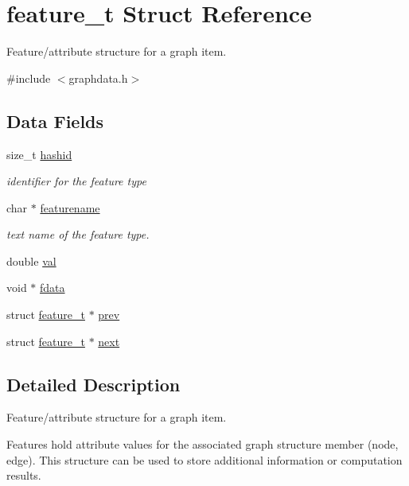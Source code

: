 \hypertarget{structfeature__t}{}\section{feature\+\_\+t Struct Reference}
\label{structfeature__t}


Feature/attribute structure for a graph item.  




{\ttfamily \#include $<$graphdata.\+h$>$}

\subsection*{Data Fields}
\begin{DoxyCompactItemize}
\item 
size\+\_\+t \hyperlink{structfeature__t_a9622cb072e66eb7ad9dd21feeaf8991c}{hashid}
\begin{DoxyCompactList}\small\item\em identifier for the feature type \end{DoxyCompactList}\item 
char $\ast$ \hyperlink{structfeature__t_a2d4a7e92af0cf4e2bdfc04ec3fb60fb5}{featurename}
\begin{DoxyCompactList}\small\item\em text name of the feature type. \end{DoxyCompactList}\item 
double \hyperlink{structfeature__t_ad4881468d7929ea65cb2a3b96e8556da}{val}
\item 
void $\ast$ \hyperlink{structfeature__t_a363d3009c71db9c2294f5227ce186649}{fdata}
\item 
struct \hyperlink{structfeature__t}{feature\+\_\+t} $\ast$ \hyperlink{structfeature__t_a58ef49f2333101b378c9301bd748c9ff}{prev}
\item 
struct \hyperlink{structfeature__t}{feature\+\_\+t} $\ast$ \hyperlink{structfeature__t_ab77c0648e065a1f6063e5c81615a6698}{next}
\end{DoxyCompactItemize}


\subsection{Detailed Description}
Feature/attribute structure for a graph item. 

Features hold attribute values for the associated graph structure member (node, edge). This structure can be used to store additional information or computation results. 

